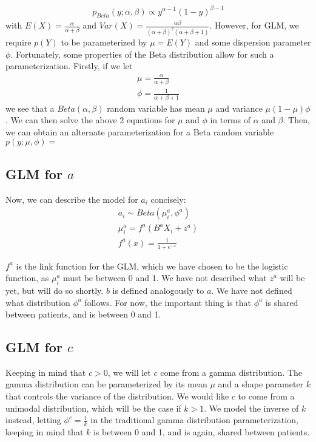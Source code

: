 \begin{eqnarray}
  p_{Beta}(y;\alpha,\beta) \propto y^{\alpha-1}(1-y)^{\beta-1}
\end{eqnarray}
with $E(X)=\frac{\alpha}{\alpha+\beta}$ and $Var(X)=\frac{\alpha\beta}{(\alpha+\beta)^2(\alpha+\beta+1)}$.  However, for GLM, we require $p(Y)$ to be parameterized by $\mu=E(Y)$ and some dispersion parameter $\phi$.  Fortunately, some properties of the Beta distribution allow for such a parameterization.  Firstly, if we let
\begin{eqnarray}
 \mu=\frac{\alpha}{\alpha+\beta} \\ 
 \phi=\frac{1}{\alpha+\beta+1} 
\end{eqnarray}
we see that a $Beta(\alpha,\beta)$ random variable has mean $\mu$ and variance $\mu(1-\mu)\phi$.  We can then solve the above 2 equations for $\mu$ and $\phi$ in terms of $\alpha$ and $\beta$.  Then, we can obtain an alternate parameterization for a Beta random variable $p(y;\mu,\phi) = $

\subsection{GLM for $a$}

Now, we can describe the model for $a_i$ concisely: 
\begin{eqnarray}
  a_i \sim Beta(\mu_i^a, \phi^a) \\
  \mu_i^a = f^a(B^aX_i + z^a) \\
  f^a(x) = \frac{1}{1+e^{-x}}
\end{eqnarray}

$f^a$ is the link function for the GLM, which we have chosen to be the logistic function, as $\mu_i^a$ must be between 0 and 1.  We have not described what $z^a$ will be yet, but will do so shortly.  $b$ is defined analogously to $a$.  We have not defined what distribution $\phi^a$ follows.  For now, the important thing is that $\phi^a$ is shared between patients, and is between 0 and 1.

\subsection{GLM for $c$}
Keeping in mind that $c > 0$, we will let $c$ come from a gamma distribution.  The gamma distribution can be parameterized by its mean $\mu$ and a shape parameter $k$ that controls the variance of the distribution.  We would like $c$ to come from a unimodal distribution, which will be the case if $k>1$.  We model the inverse of $k$ instead, letting $\phi^c =\frac{1}{k}$ in the traditional gamma distribution parameterization, keeping in mind that $k$ is between 0 and 1, and is again, shared between patients.

